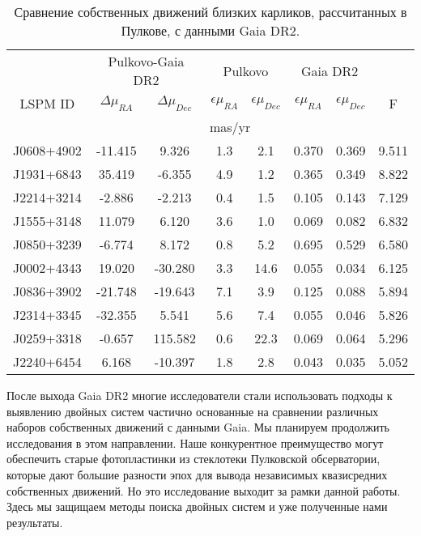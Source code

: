 \begin{table} [htbp]
	\centering
	\caption{Сравнение собственных движений близких карликов, рассчитанных в Пулкове, с данными Gaia DR2.}%
	\label{tab:pul-gaia}%
	\begin{tabularx}{\textwidth}{ c | c | c | c |c | c | c | c }
	  \hline
           & \multicolumn{2}{c|}{Pulkovo-Gaia DR2} &   \multicolumn{2}{c|}{Pulkovo}    &   \multicolumn{2}{c|}{Gaia DR2}    &       \\ \cline{2-7}
 LSPM ID   &    $\Delta\mu_{RA}$    &   $\Delta\mu_{Dec}$   & $\epsilon\mu_{RA}$ & $\epsilon\mu_{Dec}$ & $\epsilon\mu_{RA}$  & $\epsilon\mu_{Dec}$ & F     \\ \cline{2-7}
           &        \multicolumn{6}{c|}{mas/yr}            &       \\ \hline
J0608+4902 & -11.415 &   9.326 & 1.3  &  2.1  & 0.370 & 0.369 & 9.511 \\
J1931+6843 &  35.419 &  -6.355 & 4.9  &  1.2  & 0.365 & 0.349 & 8.822 \\
J2214+3214 &  -2.886 &  -2.213 & 0.4  &  1.5  & 0.105 & 0.143 & 7.129 \\
J1555+3148 &  11.079 &   6.120 & 3.6  &  1.0  & 0.069 & 0.082 & 6.832 \\
J0850+3239 &  -6.774 &   8.172 & 0.8  &  5.2  & 0.695 & 0.529 & 6.580 \\
J0002+4343 &  19.020 & -30.280 & 3.3  & 14.6  & 0.055 & 0.034 & 6.125 \\
J0836+3902 & -21.748 & -19.643 & 7.1  &  3.9  & 0.125 & 0.088 & 5.894 \\
J2314+3345 & -32.355 &   5.541 & 5.6  &  7.4  & 0.055 & 0.046 & 5.826 \\
J0259+3318 &  -0.657 & 115.582 & 0.6  & 22.3  & 0.069 & 0.064 & 5.296 \\
J2240+6454 &   6.168 & -10.397 & 1.8  &  2.8  & 0.043 & 0.035 & 5.052 \\
\hline
	\end{tabularx}%
\end{table}

После выхода Gaia DR2 многие исследователи стали использовать подходы к выявлению двойных систем частично основанные на сравнении различных наборов собственных движений с данными Gaia. Мы планируем продолжить исследования в этом направлении. Наше конкурентное преимущество могут обеспечить старые фотопластинки из стеклотеки Пулковской обсерватории, которые дают большие разности эпох для вывода независимых квазисредних собственных движений. Но это исследование выходит за рамки данной работы. Здесь мы защищаем методы поиска двойных систем и уже полученные нами результаты.
